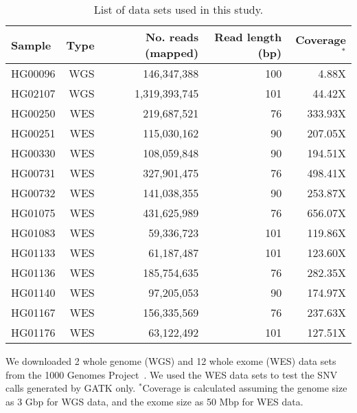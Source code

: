 \documentclass[10pt,a4paper]{article}
\begin{document}
\begin{table}[htb]
\caption{List of data sets used in this study.}
\begin{center}
\begin{tabular}{|l|r|r|r|r|}
\hline
{\bf Sample} & {\bf Type} & {\bf No. reads (mapped)} & {\bf Read length (bp)} & {\bf Coverage$^*$}\\
\hline
HG00096 & WGS & 146,347,388 & 100 & 4.88X\\
HG02107 & WGS & 1,319,393,745 & 101 & 44.42X\\
\hline
HG00250 & WES & 219,687,521 & 76 & 333.93X \\ 
HG00251 & WES & 115,030,162 & 90 & 207.05X \\ 
HG00330 & WES & 108,059,848 & 90 & 194.51X \\ 
HG00731 & WES & 327,901,475 & 76 & 498.41X \\ 
HG00732 & WES & 141,038,355 & 90 & 253.87X \\ 
HG01075 & WES & 431,625,989 & 76 & 656.07X \\ 
HG01083 & WES & 59,336,723 & 101 & 119.86X \\ 
HG01133 & WES & 61,187,487 & 101 & 123.60X \\ 
HG01136 & WES & 185,754,635 & 76 & 282.35X \\ 
HG01140 & WES & 97,205,053 & 90 & 174.97X \\ 
HG01167 & WES & 156,335,569 & 76 & 237.63X \\ 
HG01176 & WES & 63,122,492 & 101 & 127.51X \\ 
\hline
\end{tabular}
\end{center}
{\footnotesize We downloaded 2 whole genome (WGS) and 12 whole exome (WES) data sets from the 1000 Genomes Project~\cite{1000GP2012}. We
  used the WES data sets to test the SNV calls generated by GATK only.
  $^*$Coverage is calculated assuming the genome size as 3 Gbp for WGS data, and the exome size as 50 Mbp for WES data.}
\label{tab:data}
\end{table}
\end{document}
